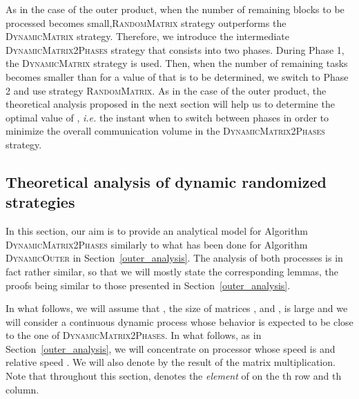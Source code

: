 \documentclass[a4paper,10pt]{article}
\newcommand{\ie}{{\it i.e.}\xspace}
\newcommand{\stupid}{\textsc{Dynamic\-Outer}\xspace}
\newcommand{\simplerandommat}{\textsc{Random\-Matrix}\xspace}
\newcommand{\stupidmat}{\textsc{Dynamic\-Matrix}\xspace}
\newcommand{\stupidthresholdmat}{\textsc{Dynamic\-Matrix\-2Phases}\xspace}
\begin{document}
\begin{algorithm}[htbp]
  \DontPrintSemicolon
  \caption{\stupidmat strategy.}
  \label{algo.stupidmat}
\end{algorithm}


As in the case of the outer product, when the number of remaining
blocks to be processed becomes small,\simplerandommat strategy
outperforms the \stupidmat strategy. Therefore, we introduce the
intermediate \stupidthresholdmat strategy that consists into two
phases. During Phase 1, the \stupidmat strategy is used. Then, when
the number of remaining tasks becomes smaller than 
for a value of  that is to be determined, we switch to Phase 2
and use strategy \simplerandommat. As in the case of the outer
product, the theoretical analysis proposed in the next section will
help us to determine the optimal value of , \ie the instant
when to switch between phases in order to minimize the overall
communication volume in the \stupidthresholdmat strategy.


\subsection{Theoretical analysis of dynamic randomized strategies}


In this section, our aim is to provide an analytical model for
Algorithm \stupidthresholdmat similarly to what has been done for Algorithm \stupid in
Section~\ref{outer_analysis}. The analysis of both processes is in
fact rather similar, so that we will mostly state the corresponding
lemmas, the proofs being similar to those presented in
Section~\ref{outer_analysis}.

In what follows, we will assume that , the size of matrices , 
and , is large and we will consider a continuous dynamic process
whose behavior is expected to be close to the one of \stupidthresholdmat. In
what follows, as in Section~\ref{outer_analysis}, we will concentrate
on processor  whose speed is  and relative speed . We will also denote by  the result of the matrix multiplication. Note that throughout this section,
 denotes the \emph{element} of  on the th row and th
column.
\end{document}
